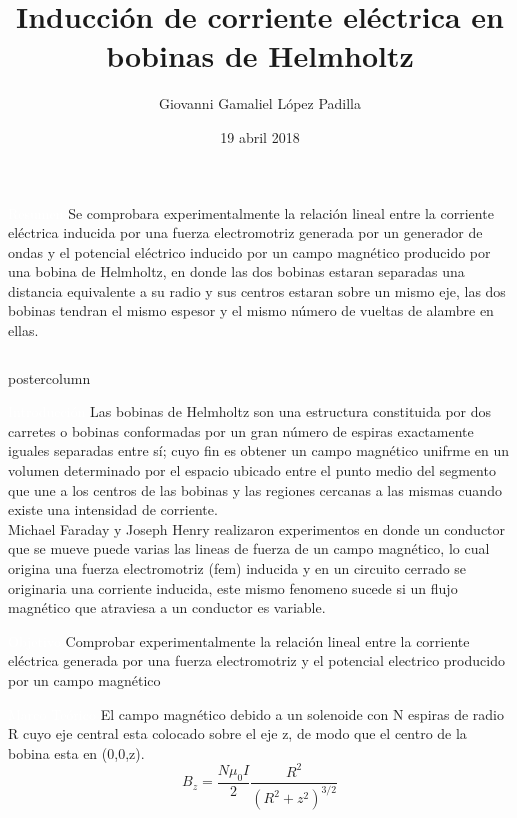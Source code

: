 \documentclass{beamer}
\title{Inducción de corriente eléctrica en bobinas de Helmholtz}
\author{Giovanni Gamaliel López Padilla}
\institute[FCFM]{Facultad de Ciencias Físico Matematicas}
\date{19 abril 2018}
\begin{document}
\begin{frame}
\vspace{2cm}
\begin{myblock}{\textcolor{white}{Resumen}}
Se comprobara experimentalmente la relación lineal entre la corriente eléctrica inducida por una fuerza electromotriz generada por un generador de ondas y el potencial eléctrico inducido por un campo magnético producido por una bobina de Helmholtz, en donde las dos bobinas estaran separadas una distancia equivalente a su radio y sus centros estaran sobre un mismo eje, las dos bobinas tendran el mismo espesor y el mismo número de vueltas de alambre en ellas.
\end{myblock}
\begin{columns}
\begin{column}{.5\textwidth}
\begin{beamercolorbox}[center]{postercolumn}
\vspace{-9.4cm}
\begin{myblock}{\textcolor{white}{Introducción}}
Las bobinas de Helmholtz son una estructura constituida por dos carretes o bobinas conformadas por un gran número de espiras exactamente iguales separadas entre sí; cuyo fin es obtener un campo magnético unifrme en un volumen determinado por el espacio ubicado entre el punto medio del segmento que une a los centros de las bobinas y las regiones cercanas a las mismas cuando existe una intensidad de corriente.\\
Michael Faraday y Joseph Henry realizaron experimentos en donde un conductor que se mueve puede varias las lineas de fuerza de un campo magnético, lo cual origina una fuerza electromotriz (fem) inducida y en un circuito cerrado se originaria una corriente inducida, este mismo fenomeno sucede si un flujo magnético que atraviesa a un conductor es variable.
\end{myblock}
\begin{myblock}{\textcolor{white}{Objetivo}}
Comprobar experimentalmente la relación lineal entre la corriente eléctrica generada por una fuerza electromotriz y el potencial electrico producido por un campo magnético
\end{myblock}
\begin{myblock}{\textcolor{white}{Marco Teórico}}
El campo magnético debido a un solenoide con N espiras de radio R cuyo eje central esta colocado sobre el eje z, de modo que el centro de la bobina esta en (0,0,z).
\begin{equation*}
B_z= \frac{N \mu_0 I}{2} \frac{R^2}{(R^2+z^2)^{3/2}}

\end{equation*}
\end{myblock}
\end{beamercolorbox}
\end{column}
\end{columns}
\end{frame}
\end{document}
